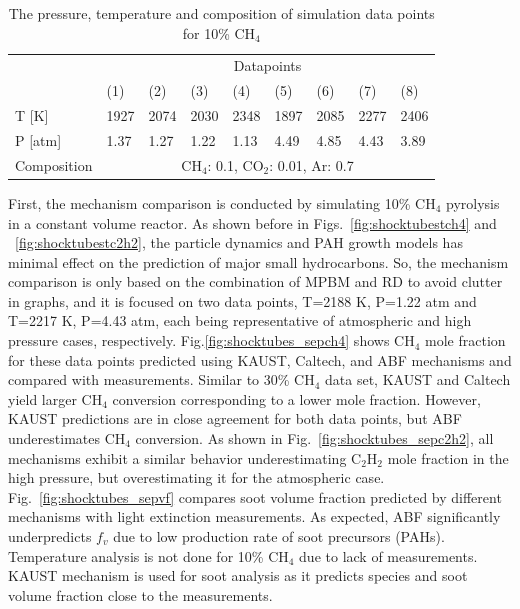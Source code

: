 \begin{table}[]
	\caption{The pressure, temperature and composition of simulation data points for 10\% $\mathrm{CH_4}$}
	\centering
	\begin{tabular}{l|llllllll|}
		\cline{2-9}
		& \multicolumn{8}{c|}{Datapoints}                       \\ \cline{2-9} 
		& (1)  & (2)  & (3)  & (4)  & (5)  & (6)  & (7)  & (8)  \\ \hline
		\multicolumn{1}{|l|}{T {[}K{]}}   & 1927 & 2074 & 2030 & 2348 & 1897 & 2085 & 2277 & 2406 \\ \hline
		\multicolumn{1}{|l|}{P {[}atm{]}} & 1.37 & 1.27 & 1.22 & 1.13 & 4.49 & 4.85 & 4.43 & 3.89 \\ \hline
		\multicolumn{1}{|l|}{Composition} & \multicolumn{8}{c|}{$\mathrm{CH_4}$: 0.1, $\mathrm{CO_2}$: 0.01, Ar: 0.7}               \\ \hline
	\end{tabular}
	\label{tab:shocktubest_CH4_10} 
\end{table}


First, the mechanism comparison is conducted by simulating 10\% $\mathrm{CH_4}$ pyrolysis in a constant volume reactor. As shown before in Figs.~\ref{fig:shocktubestch4} and ~\ref{fig:shocktubestc2h2}, the particle dynamics and PAH growth models has minimal effect on the prediction of major small hydrocarbons. So, the mechanism comparison is only based on the combination of MPBM and RD to avoid clutter in graphs, and it is focused on two data points, T=2188 K, P=1.22 atm and T=2217 K, P=4.43 atm, each being representative of atmospheric and high pressure cases, respectively. Fig.\ref{fig:shocktubes_sepch4} shows $\mathrm{CH_4}$ mole fraction for these data points predicted using KAUST, Caltech, and ABF mechanisms and compared with measurements. Similar to 30\% $\mathrm{CH_4}$ data set, KAUST and Caltech yield larger $\mathrm{CH_4}$ conversion corresponding to a lower mole fraction. However, KAUST predictions are in close agreement for both data points, but ABF underestimates $\mathrm{CH_4}$ conversion. As shown in Fig.~\ref{fig:shocktubes_sepc2h2}, all mechanisms exhibit a similar behavior underestimating $\mathrm{C_2H_2}$ mole fraction in the high pressure, but overestimating it for the atmospheric case. Fig.~\ref{fig:shocktubes_sepvf} compares soot volume fraction predicted by different mechanisms with light extinction measurements. As expected, ABF significantly underpredicts $f_v$ due to low production rate of soot precursors (PAHs). Temperature analysis is not done for 10\% $\mathrm{CH_4}$ due to lack of measurements. KAUST mechanism is used for soot analysis as it predicts species and soot volume fraction close to the measurements.

